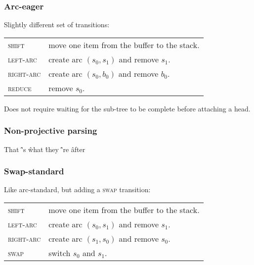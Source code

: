 \documentclass[t]{beamer}
\begin{document}
\begin{frame}
  \frametitle{Arc-eager}
  Slightly different set of transitions:

  \begin{tabular}{ll}
    \textsc{shift} & move one item from the buffer to the stack. \\
    \textsc{left-arc} & create arc $(s_0, s_1)$ and remove $s_1$. \\
    \textsc{right-arc} & create arc $(s_0, b_0)$ and remove $b_0$. \\
    \textsc{reduce} & remove $s_0$.
  \end{tabular}

  \vfill

  Does not require waiting for the sub-tree to be complete before attaching a head.
\end{frame}

\begin{frame}
  \frametitle{Non-projective parsing}
  \begin{center}
    \begin{dependency}
      \begin{deptext}[column sep=1.5em,ampersand replacement=\^,font=\rmfamily]
        That \^ 's \^ what \^ they \^ 're \^ after \\
      \end{deptext}
    \end{dependency}
  \end{center}
\end{frame}

\begin{frame}
  \frametitle{Swap-standard}
  Like arc-standard, but adding a \textsc{swap} transition:

  \begin{tabular}{ll}
    \textsc{shift} & move one item from the buffer to the stack. \\
    \textsc{left-arc} & create arc $(s_0, s_1)$ and remove $s_1$. \\
    \textsc{right-arc} & create arc $(s_1, s_0)$ and remove $s_0$. \\
    \textsc{swap} & switch $s_0$ and $s_1$.
  \end{tabular}
\end{frame}
\end{document}
